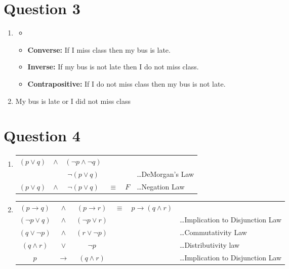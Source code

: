 \documentclass{article}
\begin{document}
    \section*{Question 3}
        \begin{enumerate}[label=\arabic*.]
            \item 
            \begin{itemize}
                \item[]
                \item \textbf{Converse:} If I miss class then my bus is late. 
                \item \textbf{Inverse:} If my bus is not late then I do not miss class.
                \item \textbf{Contrapositive:} If I do not miss class then my bus is not late. 
            \end{itemize}
            \item My bus is late or I did not miss class
        \end{enumerate}
    \newpage
    \section*{Question 4}
    \begin{enumerate}[label=\arabic*.]
        \item  
        \begin{tabular}{c c c c c l}
            $(p \vee q)$ & $\wedge$ & $(\lnot p \wedge \lnot q)$\\ \cline{3-3}
             & & $\lnot(p \vee q)$ & & & \dots DeMorgan’s Law \\
            $(p \vee q)$ & $\wedge$ & $\lnot(p \vee q)$ & $\equiv$ & $F$ & \dots Negation Law 
            
        \end{tabular}            
        \item 
        \begin{tabular}{c c c c c l}
            $(p\rightarrow q)$ & $\wedge$ & $(p\rightarrow r)$ & $\equiv$ & $p\rightarrow (q \wedge r)$ & \\ \cline{1-1} \cline{3-3}
            $(\lnot p \vee q)$ & $\wedge$ & $(\lnot p \vee r)$ & & & \dots Implication to Disjunction Law \\ \cline{1-1} \cline{3-3}
            $(q \vee \lnot p)$ & $\wedge$ & $(r \vee \lnot p)$ & & & \dots Commutativity Law \\ \cline{1-3}
            $(q \wedge r)$ & $\vee$ & $\lnot p$ & & &  \dots Distributivity law \\ \cline{1-3}
            $p$ & $\rightarrow $ & $(q \wedge r)$ & & & \dots Implication to Disjunction Law
        \end{tabular}   
        \end{enumerate}
    \newpage
\end{document}
